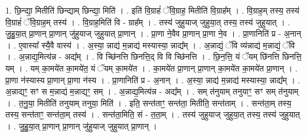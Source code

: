 \documentclass[17pt]{extarticle}
\begin{document}
1. छि॒न्द्या॒ मितीति॑ छिन्द्याम् छिन्द्या॒ मिति॑ । . इति॑ वि॒ग्राहं॑ ॅवि॒ग्राह॒ मितीति॑ वि॒ग्राह᳚म् । . वि॒ग्राह॒म् तस्य॒ तस्य॑ वि॒ग्राहं॑ ॅवि॒ग्राह॒म् तस्य॑ । . वि॒ग्राह॒मिति॑ वि - ग्राह᳚म् । . तस्य॑ जुहुयाज् जुहुया॒त् तस्य॒ तस्य॑ जुहुयात् । . जु॒हु॒या॒त् प्रा॒णान् प्रा॒णान् जु॑हुयाज् जुहुयात् प्रा॒णान् । . प्रा॒णा ने॒वैव प्रा॒णान् प्रा॒णा ने॒व । . प्रा॒णानिति॑ प्र - अ॒नान् । . ए॒वास्या᳚ स्यै॒वै वास्य॑ । . अ॒स्या॒ न्नाद्य॑ म॒न्नाद्य॑ मस्यास्या॒ न्नाद्य᳚म् । . अ॒न्नाद्यं॒ ॅवि व्य॑न्नाद्य॑ म॒न्नाद्यं॒ ॅवि । . अ॒न्नाद्य॒मित्य॑न्न - अद्य᳚म् । . वि च्छि॑नत्ति छिनत्ति॒द् वि वि च्छि॑नत्ति । . छि॒न॒त्ति॒ यं ॅयम् छि॑नत्ति छिनत्ति॒ यम् । . यम् का॒मये॑त का॒मये॑त॒ यं ॅयम् का॒मये॑त । . का॒मये॑त प्रा॒णान् प्रा॒णान् का॒मये॑त का॒मये॑त प्रा॒णान् । . प्रा॒णा न॑स्यास्य प्रा॒णान् प्रा॒णा न॑स्य । . प्रा॒णानिति॑ प्र - अ॒नान् । . अ॒स्या॒ न्नाद्य॑ म॒न्नाद्य॑ मस्यास्या॒ न्नाद्य᳚म् । . अ॒न्नाद्यꣳ॒॒ सꣳ स म॒न्नाद्य॑ म॒न्नाद्यꣳ॒॒ सम् । . अ॒न्नाद्य॒मित्य॑न्न - अद्य᳚म् । . सम् त॑नुयाम् तनुयाꣳ॒॒ सꣳ सम् त॑नुयाम् । . त॒नु॒या॒ मितीति॑ तनुयाम् तनुया॒ मिति॑ । . इति॒ सन्त॑ताꣳ॒॒ सन्त॑ता॒ मितीति॒ सन्त॑ताम् । . सन्त॑ता॒म् तस्य॒ तस्य॒ सन्त॑ताꣳ॒॒ सन्त॑ता॒म् तस्य॑ । . सन्त॑ता॒मिति॒ सं - त॒ता॒म् । . तस्य॑ जुहुयाज् जुहुया॒त् तस्य॒ तस्य॑ जुहुयात् । . जु॒हु॒या॒त् प्रा॒णान् प्रा॒णान् जु॑हुयाज् जुहुयात् प्रा॒णान् । \newline
\end{document}
